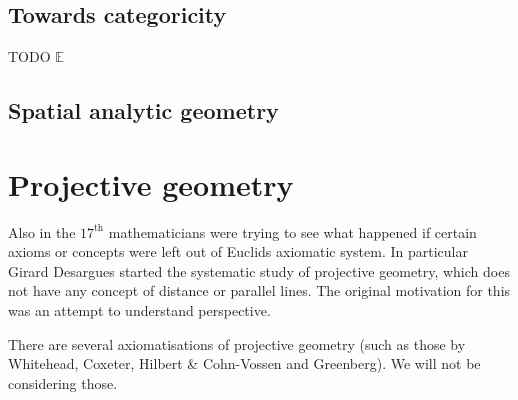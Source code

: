 \subsection{Towards categoricity}
TODO $\mathbb{E}$
\subsection{Spatial analytic geometry}

\section{Projective geometry}

Also in the $17^\text{th}$ mathematicians were trying to see what happened if certain axioms or concepts were left out of Euclids axiomatic system.
In particular Girard Desargues started the systematic study of projective geometry, which does not have any concept of distance or parallel lines. The original motivation for this was an attempt to understand perspective.

There are several axiomatisations of projective geometry (such as those by Whitehead, Coxeter, Hilbert \& Cohn-Vossen and Greenberg). We will not be considering those.

